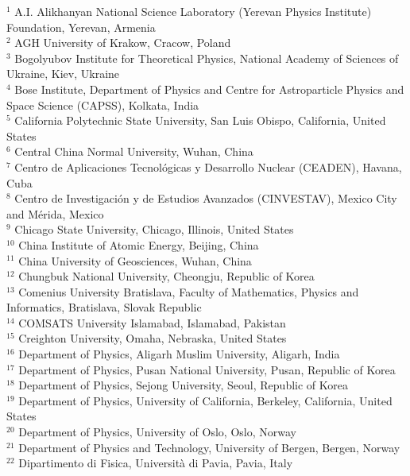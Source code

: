 \begin{flushleft}
$^{1}$ A.I. Alikhanyan National Science Laboratory (Yerevan Physics Institute) Foundation, Yerevan, Armenia\\
$^{2}$ AGH University of Krakow, Cracow, Poland\\
$^{3}$ Bogolyubov Institute for Theoretical Physics, National Academy of Sciences of Ukraine, Kiev, Ukraine\\
$^{4}$ Bose Institute, Department of Physics  and Centre for Astroparticle Physics and Space Science (CAPSS), Kolkata, India\\
$^{5}$ California Polytechnic State University, San Luis Obispo, California, United States\\
$^{6}$ Central China Normal University, Wuhan, China\\
$^{7}$ Centro de Aplicaciones Tecnol\'{o}gicas y Desarrollo Nuclear (CEADEN), Havana, Cuba\\
$^{8}$ Centro de Investigaci\'{o}n y de Estudios Avanzados (CINVESTAV), Mexico City and M\'{e}rida, Mexico\\
$^{9}$ Chicago State University, Chicago, Illinois, United States\\
$^{10}$ China Institute of Atomic Energy, Beijing, China\\
$^{11}$ China University of Geosciences, Wuhan, China\\
$^{12}$ Chungbuk National University, Cheongju, Republic of Korea\\
$^{13}$ Comenius University Bratislava, Faculty of Mathematics, Physics and Informatics, Bratislava, Slovak Republic\\
$^{14}$ COMSATS University Islamabad, Islamabad, Pakistan\\
$^{15}$ Creighton University, Omaha, Nebraska, United States\\
$^{16}$ Department of Physics, Aligarh Muslim University, Aligarh, India\\
$^{17}$ Department of Physics, Pusan National University, Pusan, Republic of Korea\\
$^{18}$ Department of Physics, Sejong University, Seoul, Republic of Korea\\
$^{19}$ Department of Physics, University of California, Berkeley, California, United States\\
$^{20}$ Department of Physics, University of Oslo, Oslo, Norway\\
$^{21}$ Department of Physics and Technology, University of Bergen, Bergen, Norway\\
$^{22}$ Dipartimento di Fisica, Universit\`{a} di Pavia, Pavia, Italy\\

\end{flushleft}

